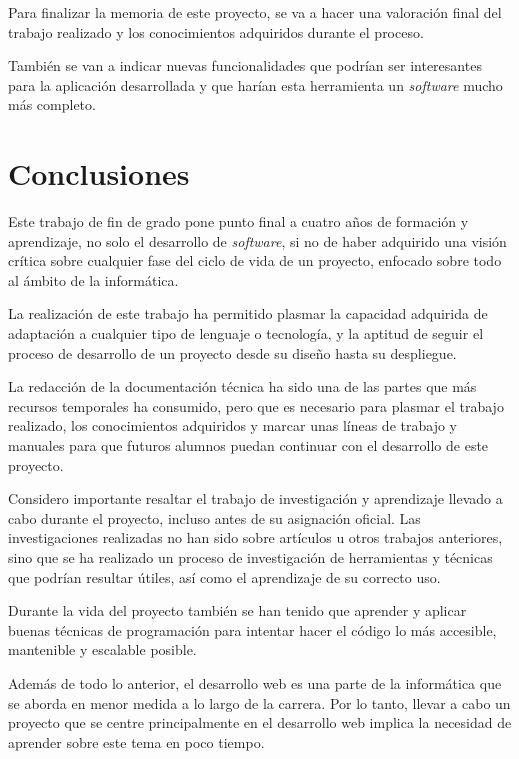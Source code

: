 
Para finalizar la memoria de este proyecto, se va a hacer una valoración final del trabajo realizado y los conocimientos adquiridos durante el proceso.

También se van a indicar nuevas funcionalidades que podrían ser interesantes para la aplicación desarrollada y que harían esta herramienta un \textit{software} mucho más completo.

\section{Conclusiones}
Este trabajo de fin de grado pone punto final a cuatro años de formación y aprendizaje, no solo el desarrollo de \textit{software}, si no de haber adquirido una visión crítica sobre cualquier fase del ciclo de vida de un proyecto, enfocado sobre todo al ámbito de la informática.

La realización de este trabajo ha permitido plasmar la capacidad adquirida de adaptación a cualquier tipo de lenguaje o tecnología, y la aptitud de seguir el proceso de desarrollo de un proyecto desde su diseño hasta su despliegue.

La redacción de la documentación técnica ha sido una de las partes que más recursos temporales ha consumido, pero que es necesario para plasmar el trabajo realizado, los conocimientos adquiridos y marcar unas líneas de trabajo y manuales para que futuros alumnos puedan continuar con el desarrollo de este proyecto.

Considero importante resaltar el trabajo de investigación y aprendizaje llevado a cabo durante el proyecto, incluso antes de su asignación oficial.
Las investigaciones realizadas no han sido sobre artículos u otros trabajos anteriores, sino que se ha realizado un proceso de investigación de herramientas y técnicas que podrían resultar útiles, así como el aprendizaje de su correcto uso.

Durante la vida del proyecto también se han tenido que aprender y aplicar buenas técnicas de programación para intentar hacer el código lo más accesible, mantenible y escalable posible.

Además de todo lo anterior, el desarrollo web es una parte de la informática que se aborda en menor medida a lo largo de la carrera. Por lo tanto, llevar a cabo un proyecto que se centre principalmente en el desarrollo web implica la necesidad de aprender sobre este tema en poco tiempo.


